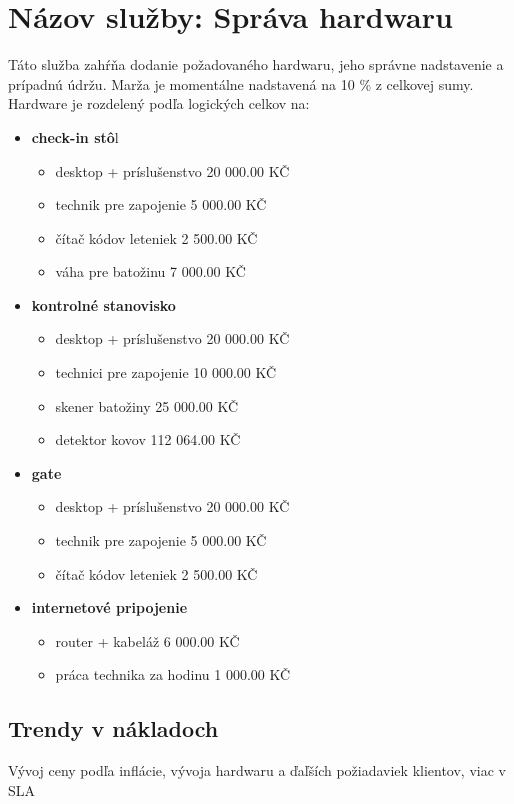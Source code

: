 \documentclass[a4paper, 11pt]{article}
\begin{document}
\section*{Názov služby: Správa hardwaru}
Táto služba zahŕňa dodanie požadovaného hardwaru, jeho správne nadstavenie a prípadnú údržu. Marža je momentálne nadstavená na 10  \% z celkovej sumy. Hardware je rozdelený podľa logických celkov na:
 \begin{itemize}
\item \textbf{check-in stô}l
\begin{itemize}
\item desktop + príslušenstvo 20 000.00 KČ
\item technik pre zapojenie 5 000.00 KČ
\item čítač kódov leteniek 2 500.00 KČ
\item váha pre batožinu 7 000.00 KČ
\end{itemize}


\item  \textbf{kontrolné stanovisko}
\begin{itemize}
\item desktop + príslušenstvo 20 000.00 KČ
\item technici pre zapojenie 10 000.00 KČ
\item skener batožiny 25 000.00 KČ
\item detektor kovov 112 064.00 KČ
\end{itemize}

\item  \textbf{gate}
\begin{itemize}
\item desktop + príslušenstvo 20 000.00 KČ
\item technik pre zapojenie 5 000.00 KČ
\item čítač kódov leteniek 2 500.00 KČ
\end{itemize}

\item  \textbf{internetové pripojenie}
\begin{itemize}
\item router + kabeláž 6 000.00 KČ
\item práca technika za hodinu 1 000.00 KČ
\end{itemize}

\end{itemize}

\subsection*{Trendy v nákladoch}
Vývoj ceny podľa inflácie, vývoja hardwaru a ďaľších požiadaviek klientov, viac v SLA
\end{document}
